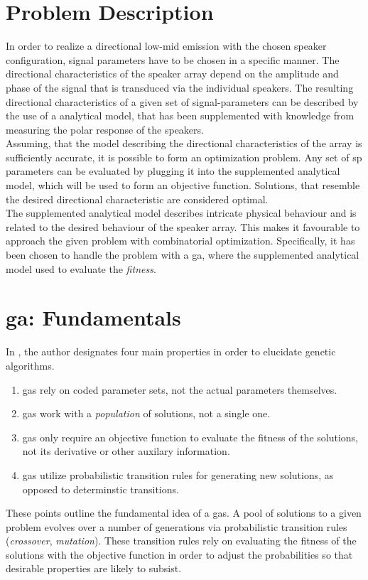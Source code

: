 \section{Problem Description}
In order to realize a directional low-mid emission with the chosen speaker configuration, signal parameters have to be chosen in a specific manner. The directional characteristics of the speaker array depend on the amplitude and phase of the signal that is transduced via the individual speakers. The resulting directional characteristics of a given set of signal-parameters can be described by the use of a analytical model, that has been supplemented with knowledge from measuring the polar response of the speakers.\\
Assuming, that the model describing the directional characteristics of the array is sufficiently accurate, it is possible to form an optimization problem. Any set of \gls{sp} parameters can be evaluated by plugging it into the supplemented analytical model, which will be used to form an objective function. Solutions, that resemble the desired directional characteristic are considered optimal.\\
The supplemented analytical model describes intricate physical behaviour and is related to the desired behaviour of the speaker array.  This makes it favourable to approach the given problem with combinatorial optimization. Specifically, it has been chosen to handle the problem with a \gls{ga}, where the supplemented analytical model used to evaluate the \textit{fitness}.


\section{\gls{ga}: Fundamentals}\label{sec:ga_fundamental}
In \citep[p. 7]{goldberg89}, the author designates four main properties in order to elucidate genetic algorithms. 
\begin{enumerate}
\item \gls{ga}s rely on coded parameter sets, not the actual parameters themselves.
\item \gls{ga}s work with a \textit{population} of solutions, not a single one.
\item \gls{ga}s only require an objective function to evaluate the fitness of the solutions, not its derivative or other auxilary information.
\item \gls{ga}s utilize probabilistic transition rules for generating new solutions, as opposed to determinstic transitions.
\end{enumerate}
These points outline the fundamental idea of a \gls{ga}s. A pool of solutions to a given problem evolves over a number of generations via probabilistic transition rules (\textit{crossover}, \textit{mutation}).
These transition rules rely on evaluating the fitness of the solutions with the objective function in order to adjust the probabilities so that desirable properties are likely to subsist.
\citep{genetic_survey}

